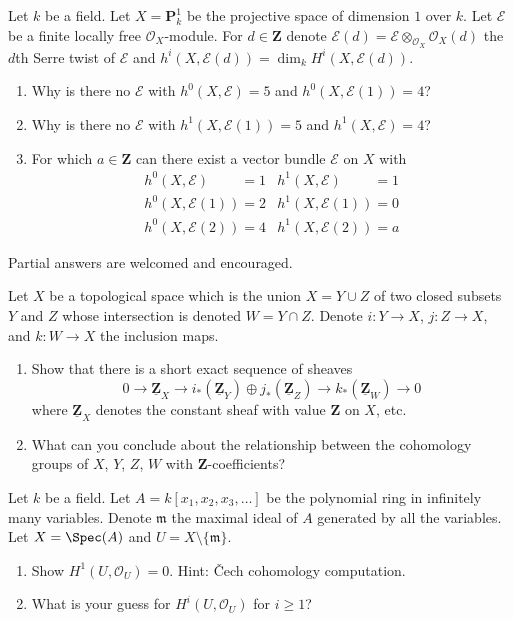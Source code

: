 \begin{exercise}
\label{exercise-can-there-be}
Let $k$ be a field. Let $X = \mathbf{P}^1_k$ be the projective space
of dimension $1$ over $k$. Let $\mathcal{E}$ be a finite locally free
$\mathcal{O}_X$-module. For $d \in \mathbf{Z}$ denote
$\mathcal{E}(d) = \mathcal{E} \otimes_{\mathcal{O}_X} \mathcal{O}_X(d)$
the $d$th Serre twist of $\mathcal{E}$ and
$h^i(X, \mathcal{E}(d)) = \dim_k H^i(X, \mathcal{E}(d))$.
\begin{enumerate}
\item Why is there no $\mathcal{E}$ with
$h^0(X, \mathcal{E}) = 5$ and $h^0(X, \mathcal{E}(1)) = 4$?
\item Why is there no $\mathcal{E}$ with
$h^1(X, \mathcal{E}(1)) = 5$ and $h^1(X, \mathcal{E}) = 4$?
\item For which $a \in \mathbf{Z}$ can there exist a vector bundle
$\mathcal{E}$ on $X$ with
$$
\begin{matrix}
h^0(X, \mathcal{E})\phantom{(1)} = 1 &
h^1(X, \mathcal{E})\phantom{(1)} = 1 \\
h^0(X, \mathcal{E}(1)) = 2 &
h^1(X, \mathcal{E}(1)) = 0 \\
h^0(X, \mathcal{E}(2)) = 4 &
h^1(X, \mathcal{E}(2)) = a
\end{matrix}
$$
\end{enumerate}
Partial answers are welcomed and encouraged.
\end{exercise}

\begin{exercise}
\label{exercise-banana}
Let $X$ be a topological space which is the union
$X = Y \cup Z$ of two closed
subsets $Y$ and $Z$ whose intersection is denoted $W = Y \cap Z$.
Denote $i : Y \to X$, $j : Z \to X$, and $k : W \to X$ the inclusion
maps.
\begin{enumerate}
\item Show that there is a short exact sequence of sheaves
$$
0 \to \underline{\mathbf{Z}}_X \to
i_*(\underline{\mathbf{Z}}_Y) \oplus
j_*(\underline{\mathbf{Z}}_Z) \to
k_*(\underline{\mathbf{Z}}_W) \to 0
$$
where $\underline{\mathbf{Z}}_X$ denotes the constant sheaf
with value $\mathbf{Z}$ on $X$, etc.
\item What can you conclude about the relationship between the
cohomology groups of $X$, $Y$, $Z$, $W$ with $\mathbf{Z}$-coefficients?
\end{enumerate}
\end{exercise}

\begin{exercise}
\label{exercise-cohomology-infinite-punctured}
Let $k$ be a field. Let $A = k[x_1, x_2, x_3, \ldots]$ be the polynomial
ring in infinitely many variables.
Denote $\mathfrak m$ the maximal ideal of $A$ generated by
all the variables. Let $X = \Spec(A)$ and $U = X \setminus \{\mathfrak m\}$.
\begin{enumerate}
\item Show $H^1(U, \mathcal{O}_U) = 0$. Hint: {\v C}ech
cohomology computation.
\item What is your guess for $H^i(U, \mathcal{O}_U)$ for $i \geq 1$?
\end{enumerate}
\end{exercise}

